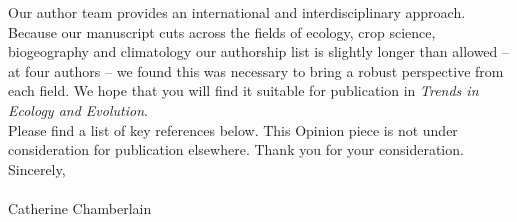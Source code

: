 \documentclass[11pt,a4paper]{article}\usepackage[]{graphicx}\usepackage[]{color}
\begin{document}
\noindent Our author team provides an international and interdisciplinary approach. Because our manuscript cuts across the fields of ecology, crop science, biogeography and climatology our authorship list is slightly longer than allowed -- at four authors -- we found this was necessary to bring a robust perspective from each field. We hope that you will find it suitable for publication in \textit{Trends in Ecology and Evolution}. \\

\noindent Please find a list of key references below. This Opinion piece is not under consideration for publication elsewhere. Thank you for your consideration. \\

\noindent Sincerely, \\
\vspace{1.5ex}\\
\noindent Catherine Chamberlain

\newpage
\nocite{Vitasse2014}
\nocite{Vitasse2014a}
\nocite{Zohner2016}
\nocite{Lenz2016}
\nocite{Allstadt2015}
\nocite{Hofmann2015}
\nocite{Kollas2014}
\nocite{Peterson2014}
\nocite{Xin2016}
\nocite{Lenz2013}
\nocite{Muffler2016}

\end{document}
